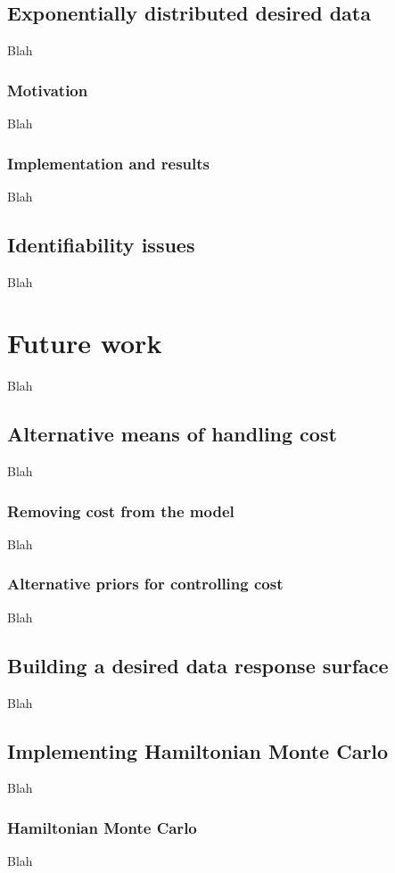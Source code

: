 \documentclass{article}
\begin{document}
\subsection{Exponentially distributed desired data}
Blah

\subsubsection{Motivation}
Blah

\subsubsection{Implementation and results}
Blah


\subsection{Identifiability issues}
Blah

\section{Future work}
Blah

\subsection{Alternative means of handling cost}
Blah

\subsubsection{Removing cost from the model}
Blah

\subsubsection{Alternative priors for controlling cost}
Blah

\subsection{Building a desired data response surface}
Blah

\subsection{Implementing Hamiltonian Monte Carlo}
Blah

\subsubsection{Hamiltonian Monte Carlo}
Blah
\end{document}
